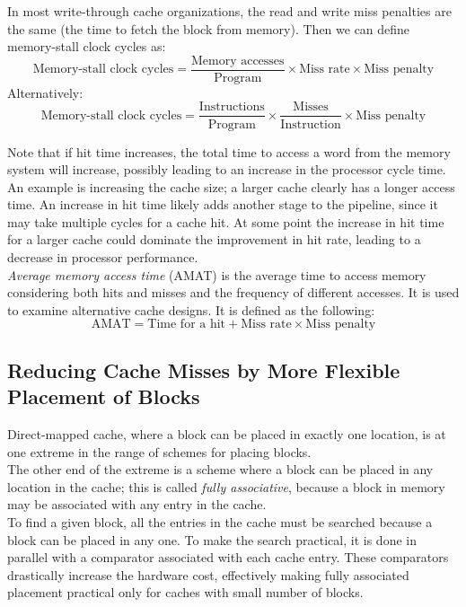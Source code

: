 \documentclass[12pt]{article}
\theoremstyle{definition}
\begin{document}
  In most write-through cache organizations, the read and write miss penalties are the same (the time to fetch the block from memory).
  Then we can define memory-stall clock cycles as:
  $$\text{Memory-stall clock cycles} = \frac{\text{Memory accesses}}{\text{Program}} \times
  \text{Miss rate} \times \text{Miss penalty}$$
  Alternatively:
  $$\text{Memory-stall clock cycles} = \frac{\text{Instructions}}{\text{Program}} \times
  \frac{\text{Misses}}{\text{Instruction}} \times \text{Miss penalty}$$

  Note that if hit time increases, the total time to access a word from the memory system will increase, possibly leading to an increase in the processor cycle time. \\
  An example is increasing the cache size;
  a larger cache clearly has a longer access time.
  An increase in hit time likely adds another stage to the pipeline, since it may take multiple cycles for a cache hit.
  At some point the increase in hit time for a larger cache could dominate the improvement in hit rate, leading to a decrease in processor performance. \\

  \emph{Average memory access time} (AMAT) is the average time to access memory considering both hits and misses and the frequency of different accesses.
  It is used to examine alternative cache designs.
  It is defined as the following:
  $$\text{AMAT} = \text{Time for a hit} + \text{Miss rate} \times \text{Miss penalty}$$

  \subsection{Reducing Cache Misses by More Flexible Placement of Blocks}
  Direct-mapped cache, where a block can be placed in exactly one location, is at one extreme in the range of schemes for placing blocks. \\
  The other end of the extreme is a scheme where a block can be placed in any location in the cache;
  this is called \emph{fully associative}, because a block in memory may be associated with any entry in the cache. \\
  To find a given block, all the entries in the cache must be searched because a block can be placed in any one.
  To make the search practical, it is done in parallel with a comparator associated with each cache entry.
  These comparators drastically increase the hardware cost, effectively making fully associated placement practical only for caches with small number of blocks. \\
\end{document}
